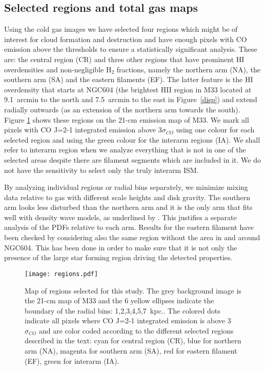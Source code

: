 \documentclass{aa}
\begin{document}
\subsection{Selected regions and total gas maps}

Using the cold gas images we have selected four regions which might be of interest for
cloud formation and destruction and have enough pixels with CO emission above the
thresholds to ensure a  statistically significant analysis. These are: the central
region (CR) and three other regions that have  prominent HI overdensities and
non-negligible H$_2$ fractions, namely the northern arm (NA), the southern arm
(SA) and the eastern filaments (EF). The latter feature is  the HI overdensity that starts at 
NGC604 (the brightest HII region in M33 located at 9.1~arcmin to the north and 7.5~arcmin
to the east in Figure~\ref{disp}) 
and extend radially outwards (as an extension of the northern arm towards the south).  
Figure \ref{map} shows these regions on
the 21-cm emission map of M33. We mark  all pixels with CO J=2-1 integrated emission
above 3$\sigma_{CO}$ using one colour for each selected region and using the green colour
for the interarm regions (IA). We shall refer to interarm region when we analyze everything
that is not in one of the selected areas despite there are filament segments which 
are included in it. We do not have the sensitivity to select only the truly interarm ISM. 

By analyzing individual regions or radial bins separately, we minimize mixing data
relative to  gas with different scale heights and disk gravity. The southern
 arm looks less disturbed than the northern arm and it is the only arm that
 fits well with density wave models, as underlined by \cite{1980ApJS...44..319H}. This
 justifies a separate analysis of the PDFs relative to each arm.  Results for the eastern
 filament have been checked by considering also the same region without the area in
 and around NGC604. This has been done in order to make sure that it is not only the
 presence of the large star forming region  driving the detected properties.



\begin{figure}
\centering
\texttt{[image: regions.pdf]}
\caption{Map of regions selected for this study. The grey background image is the 21-cm map of M33 and the 6
yellow ellipses indicate the boundary of the radial bins: 1,2,3,4,5,7~kpc.. The colored dots indicate all pixels
where CO J=2-1 integrated emission is above 3$\sigma_{CO}$ and are color coded according to the
different selected regions described in the text:  cyan for central region (CR), blue for northern arm (NA), 
magenta for southern arm (SA), red for eastern filament (EF), green for interarm (IA).
}
\label{map}
\end{figure}
\end{document}
